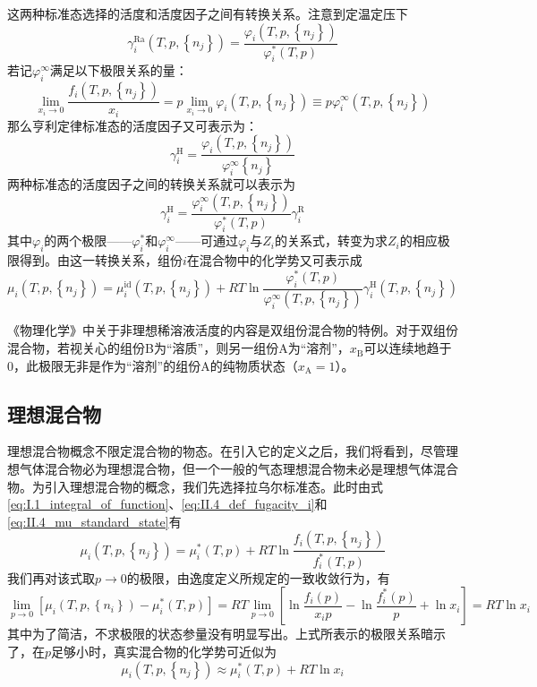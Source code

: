 \documentclass[main.tex]{subfiles}
\begin{document}
这两种标准态选择的活度和活度因子之间有转换关系。注意到定温定压下
\[\gamma_i^\text{Ra}\left(T,p,\left\{n_j\right\}\right)              =\frac{\varphi_i\left(T,p,\left\{n_j\right\}\right)}{\varphi_i^*\left(T,p\right)}\]
若记$\varphi_i^\infty$满足以下极限关系的量：
\[  \lim_{x_i\to 0}\frac{f_i\left(T,p,\left\{n_j\right\}\right)}{x_i}  =p\lim_{x_i\to 0}\varphi_i\left(T,p,\left\{n_j\right\}\right)\equiv p\varphi_i^\infty\left(T,p,\left\{n_j\right\}\right)\]
那么亨利定律标准态的活度因子又可表示为：
\[\gamma_i^\text{H}=\frac{\varphi_i\left(T,p,\left\{n_j\right\}\right)}{\varphi_i^\infty\left\{n_j\right\}}\]
两种标准态的活度因子之间的转换关系就可以表示为
\[\gamma_i^\text{H}                                                  =\frac{\varphi_i^\infty\left(T,p,\left\{n_j\right\}\right)}{\varphi_i^*\left(T,p\right)}\gamma_i^\text{R}\]
其中$\varphi_i$的两个极限——$\varphi_i^*$和$\varphi_i^\infty$——可通过$\varphi_i$与$Z_i$的关系式，转变为求$Z_i$的相应极限得到。由这一转换关系，组份$i$在混合物中的化学势又可表示成
\begin{equation}\label{eq:II.4_Henry_standardstate_activity_factor}
  \mu_i\left(T,p,\left\{n_j\right\}\right)=\mu_i^\text{id}\left(T,p,\left\{n_j\right\}\right)+RT\ln\frac{\varphi_i^*\left(T,p\right)}{\varphi_i^\infty\left(T,p,\left\{n_j\right\}\right)}\gamma_i^\text{H}\left(T,p,\left\{n_j\right\}\right)
\end{equation}

《物理化学》中关于非理想稀溶液活度的内容是双组份混合物的特例。对于双组份混合物，若视关心的组份B为“溶质”，则另一组份A为“溶剂”，$x_\text{B}$可以连续地趋于0，此极限无非是作为“溶剂”的组份A的纯物质状态（$x_\text{A}=1$）。

\subsection{理想混合物}
理想混合物概念不限定混合物的物态。在引入它的定义之后，我们将看到，尽管理想气体混合物必为理想混合物，但一个一般的气态理想混合物未必是理想气体混合物。为引入理想混合物的概念，我们先选择拉乌尔标准态。此时由式\eqref{eq:I.1_integral_of_function}、\eqref{eq:II.4_def_fugacity_i}和\eqref{eq:II.4_mu_standard_state}有
\[\mu_i\left(T,p,\left\{n_j\right\}\right)=\mu_i^*\left(T,p\right)+RT\ln\frac{f_i\left(T,p,\left\{n_j\right\}\right)}{f_i^*\left(T,p\right)}\]
我们再对该式取$p\rightarrow 0$的极限，由逸度定义所规定的一致收敛行为，有
\[\lim_{p\to 0}\left[\mu_i\left(T,p,\left\{n_i\right\}\right)-\mu_i^*\left(T,p\right)\right]=RT\lim_{p\to 0}\left[\ln\frac{f_i\left(p\right)}{x_ip}-\ln\frac{f_i^*\left(p\right)}{p}+\ln x_i\right]=RT\ln x_i\]
其中为了简洁，不求极限的状态参量没有明显写出。上式所表示的极限关系暗示了，在$p$足够小时，真实混合物的化学势可近似为
\[\mu_i\left(T,p,\left\{n_j\right\}\right)\approx\mu_i^*\left(T,p\right)+RT\ln x_i\]
\end{document}
